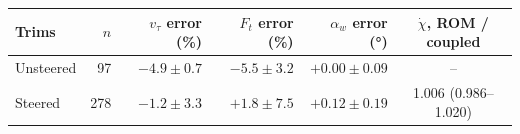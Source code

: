 \begin{tabular}{lrrrrc}
\toprule
Trims & $n$ & $v_\tau$ error (\%) & $F_t$ error (\%) & $\alpha_w$ error (\si{\degree}) & $\dot\chi$, ROM / coupled \\
\midrule
Unsteered & 97 & $-4.9\pm0.7$ & $-5.5\pm3.2$ & $+0.00\pm0.09$ & -- \\
Steered & 278 & $-1.2\pm3.3$ & $+1.8\pm7.5$ & $+0.12\pm0.19$ & 1.006 (0.986--1.020) \\
\bottomrule
\end{tabular}
